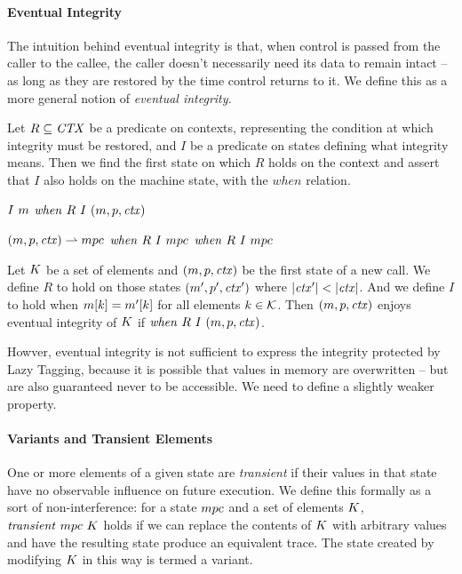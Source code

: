 \documentclass[10pt,conference]{ieeetran}%
\theoremstyle{definition}
\begin{document}
\paragraph*{Eventual Integrity}

The intuition behind eventual integrity is that, when control is passed from the
caller to the callee, the caller doesn't necessarily need its data to remain intact --
as long as they are restored by the time control returns to it. We define this as a more
general notion of {\it eventual integrity.}

Let \(R \subseteq \mathit{CTX}\) be a predicate on contexts, representing the condition at
which integrity must be restored, and \(I\) be a predicate on states defining what integrity
means. Then we find the first state on which \(R\) holds on the context and assert that
\(I\) also holds on the machine state, with the \(\mathit{when}\) relation.

            {\(I ~ m\)}
            {\(\mathit{when} ~ R ~ I ~ (m,p,\mathit{ctx})\)}

              {\((m,p,\mathit{ctx}) \rightharpoonup mpc\)}
              {\(\mathit{when} ~ R ~ I ~ mpc\)}
              {\(\mathit{when} ~ R ~ I ~ mpc\)}

 Let \(K\) be a set of elements and \((m,p,\mathit{ctx})\)
be the first state of a new call. We define \(R\) to hold on those states
\((m',p',\mathit{ctx}')\) where \(|\mathit{ctx}'| < |\mathit{ctx}|\). And we define
\(I\) to hold when \(m[k] = m'[k]\) for all elements
\(k \in {\mathcal K}\). Then \((m,p,\mathit{ctx})\) enjoys eventual
integrity of \(K\) if \(\mathit{when} ~ R ~ I ~ (m,p,\mathit{ctx})\).

Howver, eventual integrity is not sufficient to express the integrity protected by
Lazy Tagging, because it is possible that values in memory are overwritten -- but
are also guaranteed never to be accessible. We need to define a slightly weaker property.

\paragraph*{Variants and Transient Elements}

One or more elements of a given state are {\it transient} if their values
in that state have no observable influence on future execution. We define this
formally as a sort of non-interference: for a state \(mpc\) and
a set of elements \(K\), \(\mathit{transient} ~ mpc ~ K\)
holds if we can replace the contents of \(K\) with arbitrary values
and have the resulting state produce an equivalent trace. The state created
by modifying \(K\) in this way is termed a variant.
\end{document}
